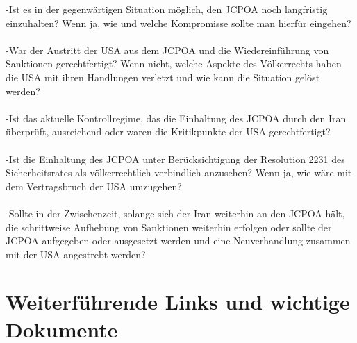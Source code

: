 \documentclass[a4paper,11pt]{article}
\begin{document}
-Ist es in der gegenwärtigen Situation möglich, den JCPOA noch langfristig einzuhalten? Wenn ja, wie und welche Kompromisse sollte man hierfür eingehen? \\ \\
-War der Austritt der USA aus dem JCPOA und die Wiedereinführung von Sanktionen gerechtfertigt? Wenn nicht, welche Aspekte des Völkerrechts haben die USA mit ihren Handlungen verletzt und wie kann die Situation gelöst werden? \\ \\
-Ist das aktuelle Kontrollregime, das die Einhaltung des JCPOA durch den Iran überprüft, ausreichend oder waren die Kritikpunkte der USA gerechtfertigt? \\ \\
-Ist die Einhaltung des JCPOA unter Berücksichtigung der Resolution 2231 des Sicherheitsrates als völkerrechtlich verbindlich anzusehen? Wenn ja, wie wäre mit dem Vertragsbruch der USA umzugehen? \\ \\
-Sollte in der Zwischenzeit, solange sich der Iran weiterhin an den JCPOA hält, die schrittweise Aufhebung von Sanktionen weiterhin erfolgen oder sollte der JCPOA aufgegeben oder ausgesetzt werden und eine Neuverhandlung zusammen mit der USA angestrebt werden?


\vspace{1cm}

  \section{Weiterführende Links und wichtige Dokumente}
  
\end{document}
